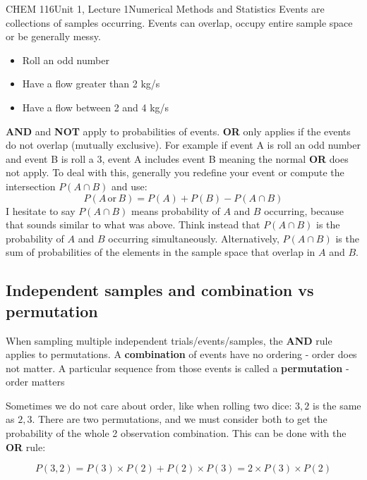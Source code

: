 \documentclass{article}
\begin{document}
\begin{tdoc}{CHEM 116}{Unit 1, Lecture 1}{Numerical Methods and Statistics}
Events are collections of samples occurring. Events can overlap, occupy
entire sample space or be generally messy.

\begin{itemize}

\item Roll an odd number
\item Have a flow greater than 2 kg/s
\item Have a flow between 2 and 4 kg/s

\end{itemize}
\vspace{0.5cm}

{\bf AND} and {\bf NOT} apply to probabilities of events. {\bf OR}
only applies if the events do not overlap (mutually exclusive). For
example if event A is roll an odd number and event B is roll a 3,
event A includes event B meaning the normal {\bf OR} does not
apply. To deal with this, generally you redefine your event or
compute the intersection $P(A\cap B)$ and use:
\begin{equation}
P(A\,\textrm{or}\,B) = P(A) + P(B) - P(A \cap B)
\end{equation}
I hesitate to say $P(A \cap B)$ means probability of $A$ and $B$
occurring, because that sounds similar to what was above. Think
instead that $P(A \cap B)$ is the probability of $A$ and $B$ occurring
simultaneously. Alternatively, $P(A \cap B)$ is the sum of
probabilities of the elements in the sample space that overlap in $A$
and $B$.

\subsection{Independent samples and combination vs permutation}

When sampling multiple independent trials/events/samples, the {\bf
  AND} rule applies to permutations. A {\bf combination} of events
have no ordering - order does not matter. A particular sequence from
those events is called a {\bf permutation} - order
matters\vspace{0.2cm}

Sometimes we do not care about order, like when rolling two dice:
$3,2$ is the same as $2,3$. There are two permutations, and we must
consider both to get the probability of the whole 2 observation
combination. This can be done with the {\bf OR} rule:

\begin{equation}
P(3,2) = P(3)\times P(2) + P(2) \times P(3) = 2\times P(3)\times P(2)
\end{equation}


\end{tdoc}
\end{document}
